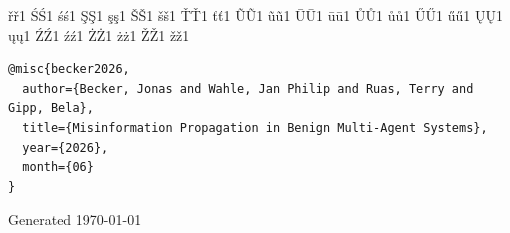\begin{tcolorbox}
{      {ř}{{\v{r}}}1  {Ś}{{\'S}}1    {ś}{{\'s}}1    {Ş}{{\c{S}}}1  {ş}{{\c{s}}}1
      {Š}{{\v{S}}}1  {š}{{\v{s}}}1  {Ť}{{\v{T}}}1  {ť}{{\v{t}}}1  {Ũ}{{\~U}}1
      {ũ}{{\~u}}1    {Ū}{{\={U}}}1  {ū}{{\={u}}}1  {Ů}{{\r{U}}}1  {ů}{{\r{u}}}1
      {Ű}{{\H{U}}}1  {ű}{{\H{u}}}1  {Ų}{{\k{U}}}1  {ų}{{\k{u}}}1  {Ź}{{\'Z}}1
      {ź}{{\'z}}1    {Ż}{{\.Z}}1    {ż}{{\.z}}1    {Ž}{{\v{Z}}}1  {ž}{{\v{z}}}1
  }
\begin{lstlisting}
@misc{becker2026,
  author={Becker, Jonas and Wahle, Jan Philip and Ruas, Terry and Gipp, Bela},
  title={Misinformation Propagation in Benign Multi-Agent Systems},
  year={2026},
  month={06}
}
\end{lstlisting}
\end{tcolorbox}




\vfill
{}
\begin{center}
\small\sffamily\textcolor{TextMuted}{Generated \today}
\end{center}
